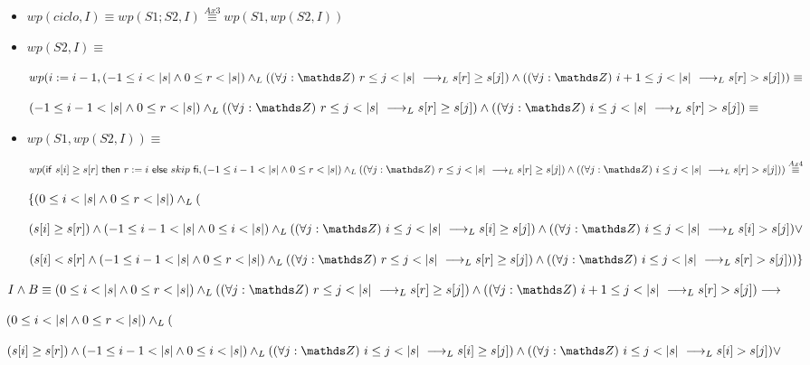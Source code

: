 \documentclass{article}
\begin{document}
\begin{itemize}
    \item $wp(ciclo, I) \equiv wp(S1;S2, I) \stackrel{Ax3}{\equiv} wp(S1,wp(S2, I))$
    \item $wp(S2,I) \equiv$
    
    $wp(i:= i - 1, (-1 \leq i < \longitud{s} \wedge 0 \leq r < \longitud{s}) \yLuego (\paraTodo{j}{r}{\longitud{s}} \implicaLuego s[r] \geq s[j]) \wedge (\paraTodo{j}{i+1}{\longitud{s}}\implicaLuego s[r] > s[j])) \equiv$

    $(-1 \leq i-1 < \longitud{s} \wedge 0 \leq r < \longitud{s}) \yLuego (\paraTodo{j}{r}{\longitud{s}} \implicaLuego s[r] \geq s[j]) \wedge (\paraTodo{j}{i}{\longitud{s}}\implicaLuego s[r] > s[j]) \equiv$

    \item $wp(S1,wp(S2, I)) \equiv$

    $wp(\IfThenElse{s[i] \geq s[r]}{r:= i}{skip}, (-1 \leq i-1 < \longitud{s} \wedge 0 \leq r < \longitud{s}) \yLuego (\paraTodo{j}{r}{\longitud{s}} \implicaLuego s[r] \geq s[j]) \wedge (\paraTodo{j}{i}{\longitud{s}}\implicaLuego s[r] > s[j])) \stackrel{Ax4}{\equiv}$

    $ \{ (0 \leq i < |s| \wedge 0 \leq r < |s|) \land _L ( $

    $ ( s[i] \geq s[r] ) \wedge (-1 \leq i-1 < \longitud{s} \wedge 0 \leq i < \longitud{s}) \yLuego (\paraTodo{j}{i}{\longitud{s}} \implicaLuego s[i] \geq s[j]) \wedge (\paraTodo{j}{i}{\longitud{s}}\implicaLuego s[i] > s[j]) \vee $

    $ ( s[i] < s[r] \wedge (-1 \leq i-1 < \longitud{s} \wedge 0 \leq r < \longitud{s}) \yLuego (\paraTodo{j}{r}{\longitud{s}} \implicaLuego s[r] \geq s[j]) \wedge (\paraTodo{j}{i}{\longitud{s}}\implicaLuego s[r] > s[j]) )\} $

\end{itemize}

$I \wedge B \equiv (0 \leq i < \longitud{s} \wedge 0 \leq r < \longitud{s}) \yLuego (\paraTodo{j}{r}{\longitud{s}} \implicaLuego s[r] \geq s[j]) \wedge (\paraTodo{j}{i+1}{\longitud{s}}\implicaLuego s[r] > s[j]) \implica $ 

$ (0 \leq i < |s| \wedge 0 \leq r < |s|) \land _L ( $

$ ( s[i] \geq s[r] ) \wedge (-1 \leq i-1 < \longitud{s} \wedge 0 \leq i < \longitud{s}) \yLuego (\paraTodo{j}{i}{\longitud{s}} \implicaLuego s[i] \geq s[j]) \wedge (\paraTodo{j}{i}{\longitud{s}}\implicaLuego s[i] > s[j]) \vee $
\end{document}
